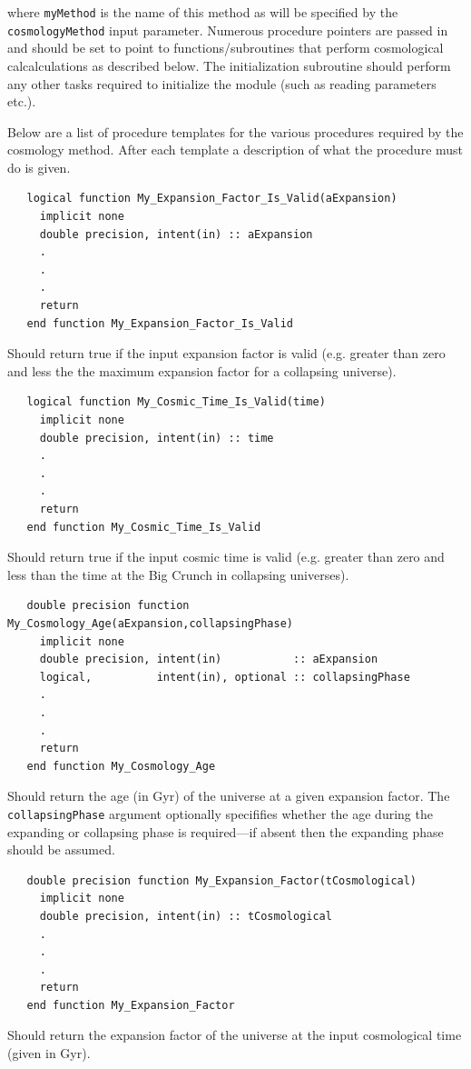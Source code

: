 where {\tt myMethod} is the name of this method as will be specified by the {\tt cosmologyMethod} input parameter. Numerous procedure pointers are passed in and should be set to point to functions/subroutines that perform cosmological calcalculations as described below. The initialization subroutine should perform any other tasks required to initialize the module (such as reading parameters etc.).

Below are a list of procedure templates for the various procedures required by the cosmology method. After each template a description of what the procedure must do is given.

\begin{verbatim}
   logical function My_Expansion_Factor_Is_Valid(aExpansion)
     implicit none
     double precision, intent(in) :: aExpansion
     .
     .
     .
     return
   end function My_Expansion_Factor_Is_Valid
\end{verbatim}
Should return true if the input expansion factor is valid (e.g. greater than zero and less the the maximum expansion factor for a collapsing universe).

\begin{verbatim}
   logical function My_Cosmic_Time_Is_Valid(time)
     implicit none
     double precision, intent(in) :: time
     .
     .
     .
     return
   end function My_Cosmic_Time_Is_Valid
\end{verbatim}
Should return true if the input cosmic time is valid (e.g. greater than zero and less than the time at the Big Crunch in collapsing universes).

\begin{verbatim}
   double precision function My_Cosmology_Age(aExpansion,collapsingPhase)
     implicit none
     double precision, intent(in)           :: aExpansion
     logical,          intent(in), optional :: collapsingPhase
     .
     .
     .
     return
   end function My_Cosmology_Age
\end{verbatim}
Should return the age (in Gyr) of the universe at a given expansion factor. The {\tt collapsingPhase} argument optionally specififies whether the age during the expanding or collapsing phase is required---if absent then the expanding phase should be assumed.

\begin{verbatim}
   double precision function My_Expansion_Factor(tCosmological)
     implicit none
     double precision, intent(in) :: tCosmological
     .
     .
     .
     return
   end function My_Expansion_Factor
\end{verbatim}
Should return the expansion factor of the universe at the input cosmological time (given in Gyr).

